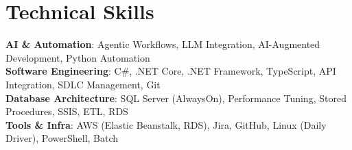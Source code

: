 \documentclass[letterpaper,11pt]{article}
\begin{document}
\section{Technical Skills}
 \begin{itemize}[leftmargin=0.15in, label={}]
    \small{\item{
     \textbf{AI \& Automation}{: Agentic Workflows, LLM Integration, AI-Augmented Development, Python Automation} \\
     \textbf{Software Engineering}{: C\#, .NET Core, .NET Framework, TypeScript, API Integration, SDLC Management, Git} \\
     \textbf{Database Architecture}{: SQL Server (AlwaysOn), Performance Tuning, Stored Procedures, SSIS, ETL, RDS} \\
     \textbf{Tools \& Infra}{: AWS (Elastic Beanstalk, RDS), Jira, GitHub, Linux (Daily Driver), PowerShell, Batch}
    }}
 \end{itemize}
\end{document}
